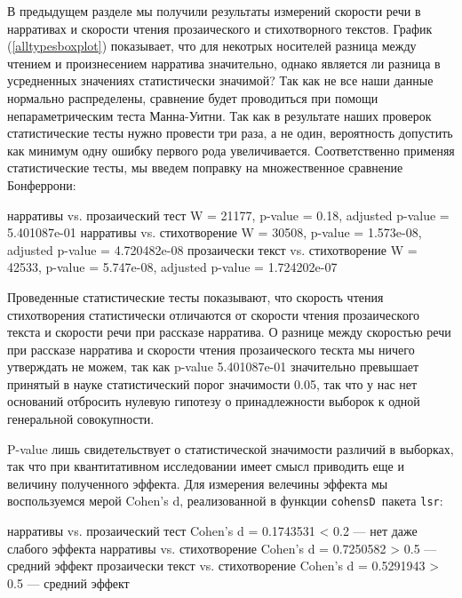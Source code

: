 \par В предыдущем разделе мы получили результаты измерений скорости речи в нарративах и скорости чтения прозаического и стихотворного текстов. График (\ref{alltypesboxplot}) показывает, что для некотрых носителей разница между чтением и произнесением нарратива значительно, однако является ли разница в усредненных значениях статистически значимой? Так как не все наши данные нормально распределены, сравнение будет проводиться при помощи непараметрическим теста Манна-Уитни. Так как в результате наших проверок статистические тесты нужно провести три раза, а не один, вероятность допустить как минимум одну ошибку первого рода увеличивается. Соответственно применяя статистические тесты, мы введем поправку на множественное сравнение Бонферрони:
\begin{itemize}
\mytem нарративы vs. прозаический тест \hfill W = 21177, p-value = 0.18, adjusted p-value = 5.401087e-01
\mytem нарративы vs. стихотворение \hfill W = 30508, p-value = 1.573e-08, adjusted p-value = 4.720482e-08
\mytem прозаически текст vs. стихотворение \hfill W = 42533, p-value = 5.747e-08, adjusted p-value = 1.724202e-07
\end{itemize}
\par Проведенные статистические тесты показывают, что скорость чтения стихотворения статистически отличаются от скорости чтения прозаического текста и скорости речи при рассказе нарратива. О разнице между скоростью речи при рассказе нарратива и скорости чтения прозаического тескта мы ничего утверждать не можем, так как p-value 5.401087e-01 значительно превышает принятый в науке статистический порог значимости 0.05, так что у нас нет оснований отбросить нулевую гипотезу о принадлежности выборок к одной генеральной совокупности.
\par P-value лишь свидетельствует о статистической значимости различий в выборках, так что при квантитативном исследовании имеет смысл приводить еще и величину полученного эффекта. Для измерения велечины эффекта мы воспользуемся мерой Cohen’s d, реализованной в функции \scriptsize\texttt{cohensD}\normalsize\ пакета \scriptsize\texttt{lsr}\normalsize:
\begin{itemize}
\mytem нарративы vs. прозаический тест \hfill Cohen’s d = 0.1743531 < 0.2 --- нет даже слабого эффекта
\mytem нарративы vs. стихотворение \hfill Cohen’s d = 0.7250582 > 0.5 --- средний эффект
\mytem прозаически текст vs. стихотворение \hfill Cohen’s d = 0.5291943 > 0.5 --- средний эффект
\end{itemize}

